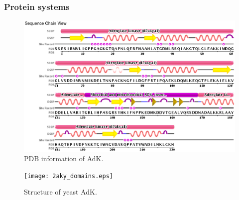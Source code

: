 \documentclass{beamer}
\begin{document}
\begin{frame}\frametitle{Protein systems}


\begin{minipage}[t]{0.48\linewidth}

\begin{figure}
\includegraphics[scale=0.31]{pdb_2aky.eps}
\caption{{\scriptsize PDB information of AdK.}}
\end{figure}
 
\end{minipage}
\hfill%
\begin{minipage}[t]{0.48\linewidth}
\begin{figure}
\texttt{[image: 2aky\_domains.eps]}
\caption{{\scriptsize Structure of yeast AdK.}}
\end{figure}
\end{minipage}

\end{frame}
\end{document}
